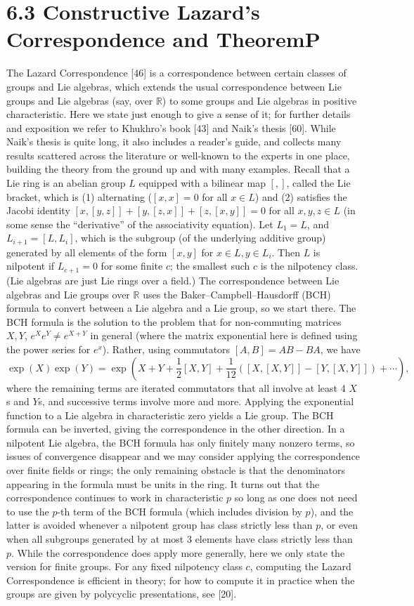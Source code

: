 \documentclass[10pt,a4paper]{article}
\begin{document}
\section*{6.3 Constructive Lazard's Correspondence and TheoremP}
The Lazard Correspondence [46] is a correspondence between certain classes of groups and Lie algebras, which extends the usual correspondence between Lie groups and Lie algebras (say, over $\mathbb R$) to some groups and Lie algebras in positive characteristic. Here we state just enough to give a sense of it; for further details and exposition we refer to Khukhro's book [43] and Naik's thesis [60]. While Naik's thesis is quite long, it also includes a reader's guide, and collects many results scattered across the literature or well-known to the experts in one place, building the theory from the ground up and with many examples.
Recall that a Lie ring is an abelian group $L$ equipped with a bilinear map $[,]$, called the Lie bracket, which is (1) alternating ($[x,x]=0$ for all $x\in L$) and (2) satisfies the Jacobi identity $[x,[y,z]]+[y,[z,x]]+[z,[x,y]]=0$ for all $x,y,z\in L$ (in some sense the ``derivative'' of the associativity equation). Let $L_1=L$, and $L_{i+1}=[L,L_i]$, which is the subgroup (of the underlying additive group) generated by all elements of the form $[x,y]$ for $x\in L,y\in L_i$. Then $L$ is nilpotent if $L_{c+1}=0$ for some finite $c$; the smallest such $c$ is the nilpotency class. (Lie algebras are just Lie rings over a field.)
The correspondence between Lie algebras and Lie groups over $\mathbb R$ uses the Baker--Campbell--Hausdorff (BCH) formula to convert between a Lie algebra and a Lie group, so we start there. The BCH formula is the solution to the problem that for non-commuting matrices $X,Y$, $e^Xe^Y\ne e^{X+Y}$ in general (where the matrix exponential here is defined using the power series for $e^x$). Rather, using commutators $[A,B]=AB-BA$, we have
\[\exp(X)\exp(Y)=\exp\left(X+Y+\frac12[X,Y]+\frac1{12}([X,[X,Y]]-[Y,[X,Y]])+\cdots\right),\]
where the remaining terms are iterated commutators that all involve at least 4 $X$s and $Y$s, and successive terms involve more and more. Applying the exponential function to a Lie algebra in characteristic zero yields a Lie group. The BCH formula can be inverted, giving the correspondence in the other direction.
In a nilpotent Lie algebra, the BCH formula has only finitely many nonzero terms, so issues of convergence disappear and we may consider applying the correspondence over finite fields or rings; the only remaining obstacle is that the denominators appearing in the formula must be units in the ring. It turns out that the correspondence continues to work in characteristic $p$ so long as one does not need to use the $p$-th term of the BCH formula (which includes division by $p$), and the latter is avoided whenever a nilpotent group has class strictly less than $p$, or even when all subgroups generated by at most 3 elements have class strictly less than $p$. While the correspondence does apply more generally, here we only state the version for finite groups. For any fixed nilpotency class $c$, computing the Lazard Correspondence is efficient in theory; for how to compute it in practice when the groups are given by polycyclic presentations, see [20].
\end{document}
